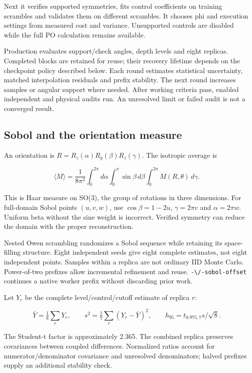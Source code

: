 Next it verifies supported symmetries, fits control coefficients on
training scrambles and validates them on different scrambles. It chooses
phi and execution settings from measured cost and variance. Unsupported
controls are disabled while the full PO calculation remains available.

Production evaluates support/check angles, depth levels and eight
replicas. Completed blocks are retained for reuse; their recovery
lifetime depends on the checkpoint policy described below. Each round
estimates statistical uncertainty, matched interpolation residuals and
prefix stability. The next round increases samples or angular support
where needed. After working criteria pass, enabled independent and
physical audits run. An unresolved limit or failed audit is not a
converged result.

\subsection{Sobol and the orientation
measure}\label{sobol-and-the-orientation-measure}

An orientation is \(R=R_z(\alpha)R_y(\beta)R_z(\gamma)\). The isotropic
average is

\[\langle M\rangle=\frac1{8\pi^2}\int_0^{2\pi}\!d\alpha
\int_0^\pi\!\sin\beta\,d\beta\int_0^{2\pi}\!M(R,\theta)\,d\gamma.\]

This is Haar measure on SO(3), the group of rotations in three
dimensions. For full-domain Sobol points \((u,v,w)\), use
\(\cos\beta=1-2u\), \(\gamma=2\pi v\) and \(\alpha=2\pi w\). Uniform
beta without the sine weight is incorrect. Verified symmetry can reduce
the domain with the proper reconstruction.

Nested Owen scrambling randomizes a Sobol sequence while retaining its
space-filling structure. Eight independent seeds give eight complete
estimates, not eight independent points. Samples within a replica are
not ordinary IID Monte Carlo. Power-of-two prefixes allow incremental
refinement and reuse. \nolinkurl{-\/-sobol-offset} continues a native
worker prefix without discarding prior work.

Let \(Y_r\) be the complete level/control/cutoff estimate of replica
\(r\):

\[\bar Y=\tfrac18\sum_rY_r,\qquad
s^2=\tfrac17\sum_r(Y_r-\bar Y)^2,\qquad
h_{95}=t_{0.975,7}s/\sqrt8.\]

The Student-t factor is approximately 2.365. The combined replica
preserves covariances between coupled differences. Normalized ratios
account for numerator/denominator covariance and unresolved
denominators; halved prefixes supply an additional stability check.

